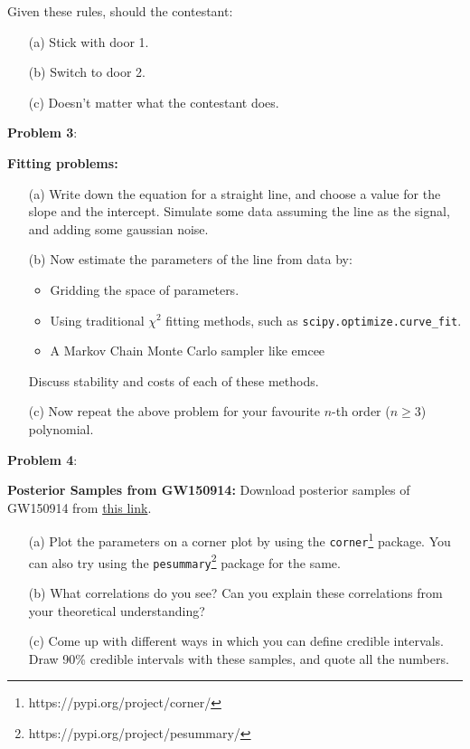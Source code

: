 \documentclass{article} %
\newcommand{\question}[2][]{\begin{flushleft}
        \textbf{Problem #1}: %
\end{flushleft}
}
\begin{document}
    Given these rules, should the contestant:
    
    \begin{enumerate}
    	\item[(a)] Stick with door 1.
    	\item[(b)] Switch to door 2.
    	\item[(c)] Doesn't matter what the contestant does.
    \end{enumerate}
    
    
    \question[3]{} 
    \textbf{Fitting problems:} 
    
    \begin{enumerate}
    	
    \item[(a)] Write down the equation for a straight line, and choose a value for the slope and the intercept. Simulate some data assuming the line as the signal, and adding some gaussian noise. 
    
    \item[(b)] Now estimate the parameters of the line from data by:
    \begin{itemize}
    	\item Gridding the space of parameters.
   		\item Using traditional $ \chi^2$ fitting methods, such as \texttt{scipy.optimize.curve\_fit}.
   		\item A Markov Chain Monte Carlo sampler like emcee
   	\end{itemize}
    Discuss stability and costs of each of these methods.
    
    
    \item[(c)] Now repeat the above problem for your favourite  $n$-th order ($n\ge3$)  polynomial.
    
    \end{enumerate}
    
    
    \question[4]{} \textbf{Posterior Samples from GW150914:}
    Download posterior samples of GW150914 from \href{https://drive.google.com/drive/folders/1L2xsQM4mfoljLTlTrF6nTbvZ1yM0l4hH?usp=sharing}{this link}.
    \begin{enumerate}
   	\item[(a)] Plot the parameters on a corner plot by using the \texttt{corner}\footnote{https://pypi.org/project/corner/} package. You can also try using the \texttt{pesummary}\footnote{https://pypi.org/project/pesummary/} package for the same.
    \item[(b)] What correlations do you see? Can you explain these correlations from your theoretical understanding?
    \item[(c)] Come up with different ways in which you can define credible intervals. Draw 90\% credible intervals with these samples, and quote all the numbers.
    \end{enumerate}
    
\end{document}
